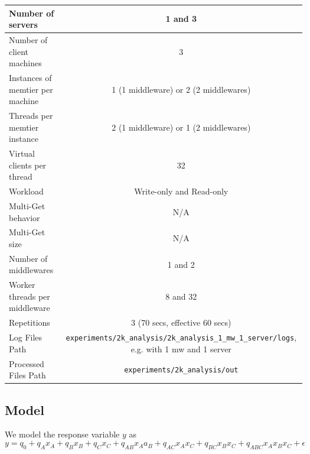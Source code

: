 \documentclass[11pt,a4paper]{article}
\begin{document}
\begin{center}
	\scriptsize{
		\begin{tabular}{|l|c|}
			\hline Number of servers                & 1 and 3                                     \\ 
			\hline Number of client machines        & 3                                           \\ 
			\hline Instances of memtier per machine & 1 (1 middleware) or 2 (2 middlewares) \\ 
			\hline Threads per memtier instance     & 2 (1 middleware) or 1 (2 middlewares)   \\
			\hline Virtual clients per thread       &  32                                     \\ 
			\hline Workload                         & Write-only and Read-only\\
			\hline Multi-Get behavior               & N/A                                         \\
			\hline Multi-Get size                   & N/A                                         \\
			\hline Number of middlewares            & 1 and 2                                     \\
			\hline Worker threads per middleware    & 8 and 32                                    \\
            \hline Repetitions                      & 3 (70 secs, effective 60 secs) \\ 
            \hline Log Files Path                   & \texttt{experiments/2k\_analysis/2k\_analysis\_1\_mw\_1\_server/logs}, e.g. with 1 mw and 1 server \\
            \hline Processed Files Path             & \texttt{experiments/2k\_analysis/out}\\
            \hline
		\end{tabular}
	} 
\end{center}

\subsection{Model}

We model the response variable $y$ as\\
\begin{equation}
    y = q_0 + q_Ax_A + q_Bx_B + q_Cx_C + q_{AB}x_Aa_B + q_{AC}x_Ax_C + q_{BC}x_Bx_C + q_{ABC}x_Ax_Bx_C + \epsilon
\end{equation}
\end{document}

